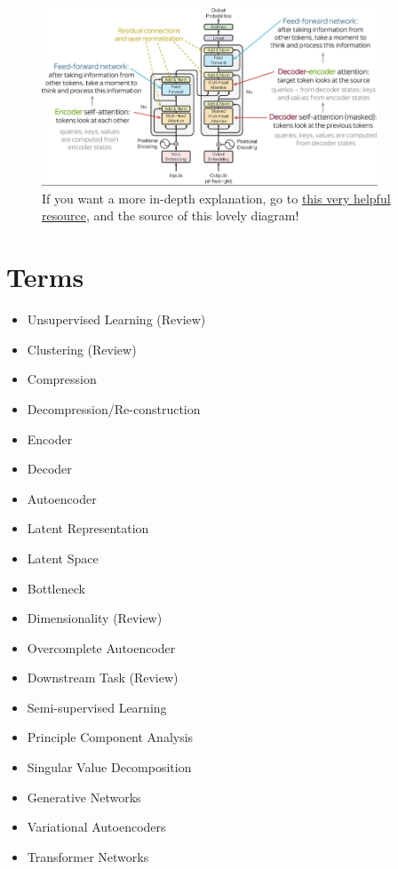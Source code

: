         \begin{figure}[H]
            \centering
            \includegraphics[width=100mm,scale=0.5]{images/autoencoder_images/transformers.png}
            \caption*{If you want a more in-depth explanation, go to \href{https://lena-voita.github.io/nlp_course/seq2seq_and_attention.html}{this very helpful resource}, and the source of this lovely diagram!}
        \end{figure}
        

\section{Terms}

    \begin{itemize}
        \item Unsupervised Learning (Review)
        \item Clustering (Review)
        \item Compression
        \item Decompression/Re-construction
        \item Encoder
        \item Decoder 
        \item Autoencoder
        \item Latent Representation
        \item Latent Space
        \item Bottleneck
        \item Dimensionality (Review)
        \item Overcomplete Autoencoder
        \item Downstream Task (Review)
        \item Semi-supervised Learning 
        \item Principle Component Analysis
        \item Singular Value Decomposition
        \item Generative Networks
        \item Variational Autoencoders
        \item Transformer Networks
    \end{itemize}

